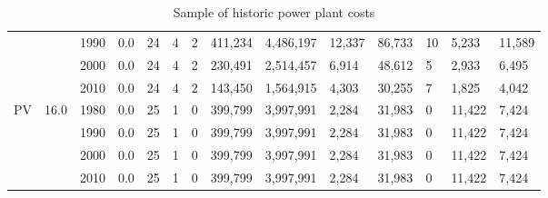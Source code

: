\begin{table*}[]
\begin{tabular}{|l|l|l|l|l|l|l|l|l|l|l|l|l|l|}
	&  & 1990 & 0.0 & 24 & 4 & 2 & 411,234 & 4,486,197 & 12,337 & 86,733 & 10 & 5,233 & 11,589 \\ \cline{3-14} 
	&  & 2000 & 0.0 & 24 & 4 & 2 & 230,491 & 2,514,457 & 6,914 & 48,612 & 5 & 2,933 & 6,495 \\ \cline{3-14} 
	&  & 2010 & 0.0 & 24 & 4 & 2 & 143,450 & 1,564,915 & 4,303 & 30,255 & 7 & 1,825 & 4,042 \\ \hline
	\multirow{4}{*}{PV} & \multirow{4}{*}{16.0} & 1980 & 0.0 & 25 & 1 & 0 & 399,799 & 3,997,991 & 2,284 & 31,983 & 0 & 11,422 & 7,424 \\ \cline{3-14} 
	&  & 1990 & 0.0 & 25 & 1 & 0 & 399,799 & 3,997,991 & 2,284 & 31,983 & 0 & 11,422 & 7,424 \\ \cline{3-14} 
	&  & 2000 & 0.0 & 25 & 1 & 0 & 399,799 & 3,997,991 & 2,284 & 31,983 & 0 & 11,422 & 7,424 \\ \cline{3-14} 
	&  & 2010 & 0.0 & 25 & 1 & 0 & 399,799 & 3,997,991 & 2,284 & 31,983 & 0 & 11,422 & 7,424 \\ \hline
	\end{tabular}
	\caption{Sample of historic power plant costs \cite{IRENA2018,IEA2015,OWPB2016}} 
	\label{table:historic_plant_costs}

\end{table*}

\clearpage








